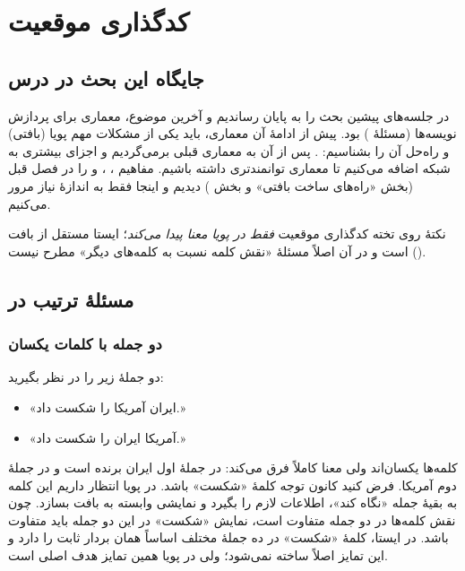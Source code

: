 \chapter{کدگذاری موقعیت}

\section{جایگاه این بحث در درس}
در جلسه‌های پیشین بحث  را به پایان رساندیم و آخرین موضوع، معماری  برای پردازش نویسه‌ها (مسئلهٔ ) بود. پیش از ادامهٔ آن معماری، باید یکی از مشکلات مهم  پویا (بافتی) و راه‌حل آن را بشناسیم: . پس از آن به معماری قبلی برمی‌گردیم و اجزای بیشتری به شبکه اضافه می‌کنیم تا معماری توانمندتری داشته باشیم. مفاهیم ، ،  و  را در فصل قبل (بخش «راه‌های ساخت  بافتی» و بخش ) دیدیم و اینجا فقط به اندازهٔ نیاز مرور می‌کنیم.

\begin{exambox}{نکتهٔ روی تخته}
کدگذاری موقعیت \emph{فقط در  پویا معنا پیدا می‌کند}؛  ایستا مستقل از بافت () است و در آن اصلاً مسئلهٔ «نقش کلمه نسبت به کلمه‌های دیگر» مطرح نیست.
\end{exambox}

\section{مسئلهٔ ترتیب در }

\subsection{دو جمله با کلمات یکسان}
دو جملهٔ زیر را در نظر بگیرید:
\begin{itemize}
  \item «ایران آمریکا را شکست داد.»
  \item «آمریکا ایران را شکست داد.»
\end{itemize}
کلمه‌ها یکسان‌اند ولی معنا کاملاً فرق می‌کند: در جملهٔ اول ایران برنده است و در جملهٔ دوم آمریکا. فرض کنید کانون توجه کلمهٔ «شکست» باشد. در  پویا انتظار داریم این کلمه به بقیهٔ جمله «نگاه کند»، اطلاعات لازم را بگیرد و نمایشی وابسته به بافت بسازد. چون نقش کلمه‌ها در دو جمله متفاوت است، نمایش «شکست» در این دو جمله باید متفاوت باشد. در  ایستا، کلمهٔ «شکست» در ده جملهٔ مختلف اساساً همان بردار ثابت را دارد و این تمایز اصلاً ساخته نمی‌شود؛ ولی در  پویا همین تمایز هدف اصلی است.

